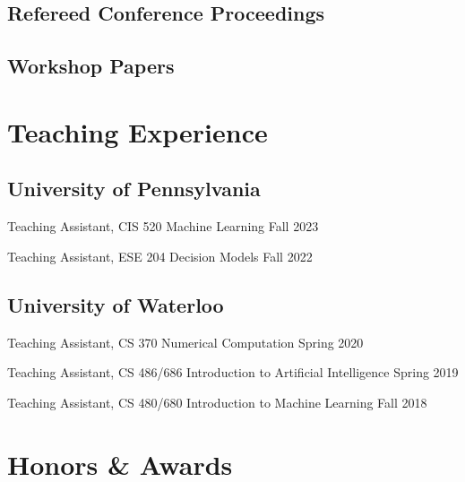\documentclass{article}
\begin{document}
\subsection{Refereed Conference Proceedings}
\newrefcontext[labelprefix=C]
\printbibliography[type=inproceedings, heading=none]

\subsection{Workshop Papers}
\newrefcontext[labelprefix=W]
\printbibliography[type=misc, heading=none]

\section{Teaching Experience}
\subsection{University of Pennsylvania}
\begin{compactList}
\item Teaching Assistant, CIS 520 Machine Learning  \hfill Fall 2023
\item Teaching Assistant, ESE 204 Decision Models \hfill Fall 2022
\end{compactList}

\subsection{University of Waterloo}
\begin{compactList}
\item Teaching Assistant, CS 370 Numerical Computation \hfill Spring 2020
\item Teaching Assistant, CS 486/686 Introduction to Artificial Intelligence \hfill Spring 2019
\item Teaching Assistant, CS 480/680 Introduction to Machine Learning \hfill Fall 2018
\end{compactList}

\section{Honors \& Awards}
\begin{compactList}
\item
\item
\item
\item
\item
\end{compactList}
\end{document}
